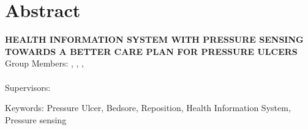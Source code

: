 \chapter*{Abstract}

\begin{center}
	\vspace{5mm}
	\MakeUppercase{\textbf{Health Information System with Pressure Sensing towards A Better Care Plan for Pressure Ulcers}}\\
	\vspace{5mm}
	Group Members: \memberA, \memberB, \memberC, \\ \memberD \\
	\vspace{5mm}
	Supervisors: \supervisorA %
	\vspace{5mm}
\end{center}

\noindent Keywords: Pressure Ulcer, Bedsore, Reposition, Health Information System, Pressure sensing\\


